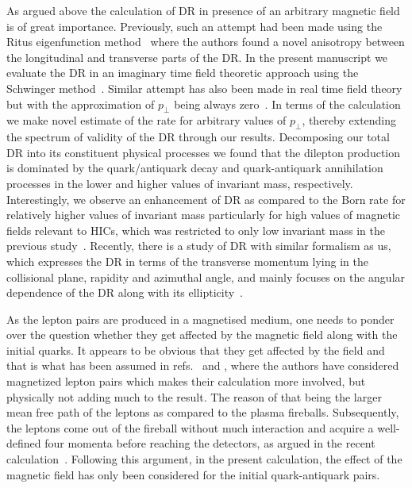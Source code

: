 \documentclass[aps,prd,floatfix,showpacs,showkeys,superscriptadress,unsortedaddress,nofootinbib,onecolumn]{revtex4-1}
\newcommand{\sperp}{\scriptscriptstyle{\perp}}
\begin{document}
As argued above the calculation of DR in presence of an arbitrary magnetic field is of great importance. Previously, such an attempt had been made using the Ritus eigenfunction method~\cite{Sadooghi:2016jyf} where the authors found a novel anisotropy between the longitudinal and transverse parts of the DR. In the present manuscript we evaluate the DR in an imaginary time field theoretic approach using the Schwinger method~\cite{Schwinger:1951nm}. Similar attempt has also been made in real time field theory but with the approximation of $p_{\sperp}$ being always zero~\cite{Ghosh:2018xhh}. In terms of the calculation we make novel estimate of the rate for arbitrary values of $p_{\sperp}$, thereby extending the spectrum of validity of the DR through our results. Decomposing our total DR into its constituent physical processes we found that the dilepton production is dominated by the quark/antiquark decay and quark-antiquark annihilation processes in the lower and higher values of invariant mass, respectively. Interestingly, we observe an enhancement of DR as compared to the Born rate for relatively higher values of invariant mass particularly for high values of magnetic fields relevant to HICs, which was restricted to only low invariant mass in the previous study~\cite{Ghosh:2018xhh}. Recently, there is a study of DR with similar formalism as us, which
expresses the DR in terms of the transverse momentum lying in the collisional plane, rapidity and azimuthal angle,
and mainly focuses on the angular dependence of the DR along with its ellipticity~\cite{Wang:2022jxx}.

As the lepton pairs are produced in a magnetised medium, one needs to ponder over the question whether they get affected by the magnetic field along with the initial quarks. It appears to be obvious that they get affected by the field and that is what has been assumed in refs.~\cite{Sadooghi:2016jyf} and \cite{Ghosh:2018xhh}, where the authors have considered magnetized lepton pairs which makes their calculation more involved, but physically not adding much to the result. The reason of that being the larger mean free path of the leptons as compared to the plasma fireballs. Subsequently, the leptons come out of the fireball without much interaction and acquire a well-defined four momenta before reaching the detectors, as argued in the recent calculation~\cite{Wang:2022jxx}. Following this argument, in the present calculation, the effect of the magnetic field has only been considered for the initial quark-antiquark pairs.
\end{document}
